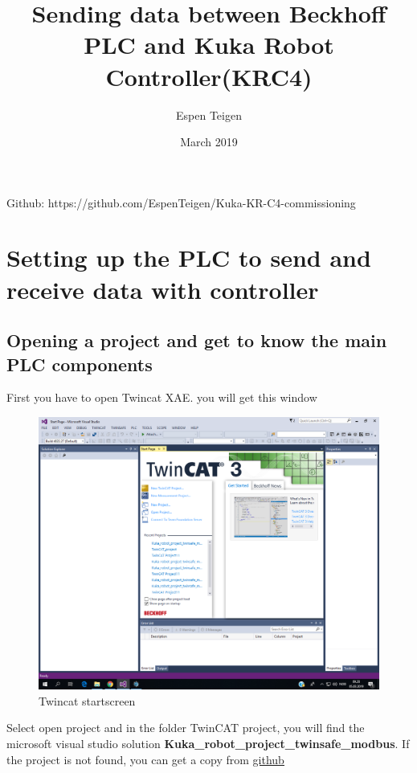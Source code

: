 \documentclass{article}
\title{Sending data between Beckhoff PLC and Kuka Robot Controller(KRC4)}
\author{Espen Teigen }
\date{March 2019}
\begin{document}
\maketitle

    Github: https://github.com/EspenTeigen/Kuka-KR-C4-commissioning

\newpage

\tableofcontents{}
\newpage
\section{Setting up the PLC to send and receive data with controller}



\subsection{Opening a project and get to know the main PLC components}
First you have to open Twincat XAE. you will get this window

\begin{figure}[!h]
    \centering
    \includegraphics[width=\textwidth]{pictures/TC3_overview/TC3_startscreen.png}
    \caption{Twincat startscreen}
    \label{fig:my_label}
\end{figure}

Select open project and in the folder TwinCAT project, you will find the microsoft visual studio solution \textbf{Kuka\_robot\_project\_twinsafe\_modbus}. If the project is not found, you can get a copy from \href{https://github.com/EspenTeigen/Kuka-KR-C4-commissioning}{\underline{github}}
\end{document}
